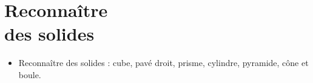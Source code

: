 \themaG
\graphicspath{{../../S18_Reconnaitre_des_solides/Images/}}

\newcommand{\cone}{\pspolygon[fillstyle=solid,fillcolor=white](0,0)(0.9,0)(0.45,1.7)}
\newcommand{\boule}{\pscircle[fillstyle=solid,fillcolor=white](0,0.45){0.45}}
\newcommand{\cube}{\psframe[fillstyle=solid,fillcolor=white](0,0)(1.15,0.9)\psline(0.75,0)(0.75,0.9)}
\newcommand{\cubeg}{\psframe[fillstyle=solid,fillcolor=white](0,0)(1.15,0.9)\psline(0.4,0)(0.4,0.9)}
          
\chapter{Reconnaître\\des solides}
\label{S18}


\begin{prerequis}
   \begin{itemize}
      \item Reconnaître des solides : cube, pavé droit, prisme, cylindre, pyramide, cône et boule.
   \end{itemize}
\end{prerequis}

\vfill

